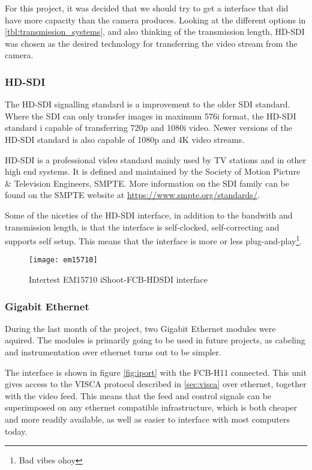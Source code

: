 For this project, it was decided that we should 
try to get a interface that did have more capacity than the camera produces. Looking 
at the different options in \vref{tbl:transmission_systems}, and also thinking of the transmission length, HD-SDI
was chosen as the desired technology for transferring the video stream from the camera.

\subsubsection{HD-SDI}\label{sec:hdsdi}
The HD-SDI signalling standard is a improvement to the older SDI standard. Where the SDI can only transfer images
in maximum 576i format, the HD-SDI standard i capable of transferring 720p and 1080i video. Newer versions 
of the HD-SDI standard is also capable of 1080p and 4K video streams. 

HD-SDI is a professional video standard mainly used by TV stations and in other high end systems. It is 
defined and maintained by the Society of Motion Picture \& Television Engineers, SMPTE. More information 
on the SDI family can be found on the SMPTE website at \url{https://www.smpte.org/standards/}.

Some of the niceties of the HD-SDI interface, in addition to the bandwith and transmission length, is 
that the interface is self-clocked, self-correcting and supports self setup. This means that the 
interface is more or less plug-and-play\footnote{Bad vibes ohoy}. 

\begin{figure}[htbp]
	\centering
	\texttt{[image: em15710]}
	\caption{Intertest EM15710 iShoot-FCB-HDSDI interface}
	\label{fig:em15710}
\end{figure}

\subsubsection{Gigabit Ethernet}
During the last month of the project, two Gigabit Ethernet modules were aquired. The modules is primarily 
going to be used in future projects, as cabeling and instrumentation over ethernet turns out to be simpler. 

The interface is shown in figure \vref{fig:iport} with the FCB-H11 connected. This unit gives access to the VISCA protocol described 
in \vref{sec:visca} over ethernet, together with the video feed. This means that the feed and control signals can be superimposed 
on any ethernet compatible infrastructure, which is both cheaper and more readily available, as well as easier 
to interface with most computers today.

